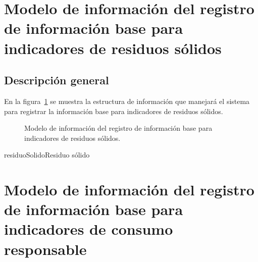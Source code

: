 \section{Modelo de información del registro de información base para indicadores de residuos sólidos}

\subsection{Descripción general}
 En la figura~\ref{fig:registroInfoBaseResiduos} se muestra la estructura de información que manejará el sistema para registrar la información base para indicadores de residuos sólidos.
 
\begin{figure}[htbp!]
	\begin{center}
		\caption{Modelo de información del registro de información base para indicadores de residuos sólidos.}
		\label{fig:registroInfoBaseResiduos}
	\end{center}
\end{figure}

\begin{BusinessEntity}{residuoSolido}{Residuo sólido}
\end{BusinessEntity}

\section{Modelo de información del registro de información base para indicadores de consumo responsable}

